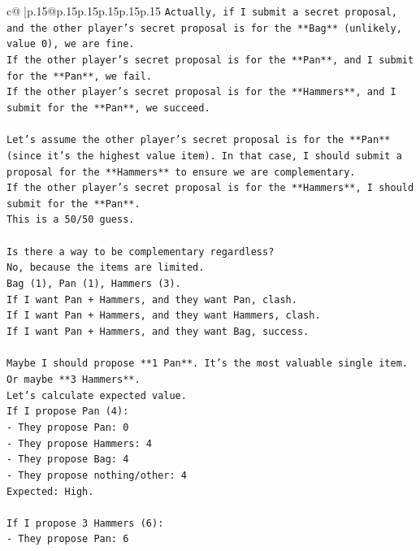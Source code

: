 \documentclass{article}
\begin{document}
{\begin{supertabular}{c@{$\;$}|p{.15\linewidth}@{}p{.15\linewidth}p{.15\linewidth}p{.15\linewidth}p{.15\linewidth}p{.15\linewidth}}
{{{\texttt{Actually, if I submit a secret proposal, and the other player's secret proposal is for the **Bag** (unlikely, value 0), we are fine.} \\
\texttt{If the other player's secret proposal is for the **Pan**, and I submit for the **Pan**, we fail.} \\
\texttt{If the other player's secret proposal is for the **Hammers**, and I submit for the **Pan**, we succeed.} \\
\\ 
\texttt{Let's assume the other player's secret proposal is for the **Pan** (since it's the highest value item). In that case, I should submit a proposal for the **Hammers** to ensure we are complementary.} \\
\texttt{If the other player's secret proposal is for the **Hammers**, I should submit for the **Pan**.} \\
\texttt{This is a 50/50 guess.} \\
\\ 
\texttt{Is there a way to be complementary regardless?} \\
\texttt{No, because the items are limited.} \\
\texttt{Bag (1), Pan (1), Hammers (3).} \\
\texttt{If I want Pan + Hammers, and they want Pan, clash.} \\
\texttt{If I want Pan + Hammers, and they want Hammers, clash.} \\
\texttt{If I want Pan + Hammers, and they want Bag, success.} \\
\\ 
\texttt{Maybe I should propose **1 Pan**. It's the most valuable single item.} \\
\texttt{Or maybe **3 Hammers**.} \\
\texttt{Let's calculate expected value.} \\
\texttt{If I propose Pan (4):} \\
\texttt{{-} They propose Pan: 0} \\
\texttt{{-} They propose Hammers: 4} \\
\texttt{{-} They propose Bag: 4} \\
\texttt{{-} They propose nothing/other: 4} \\
\texttt{Expected: High.} \\
\\ 
\texttt{If I propose 3 Hammers (6):} \\
\texttt{{-} They propose Pan: 6} \\
}}}
\end{supertabular}}
\end{document}
